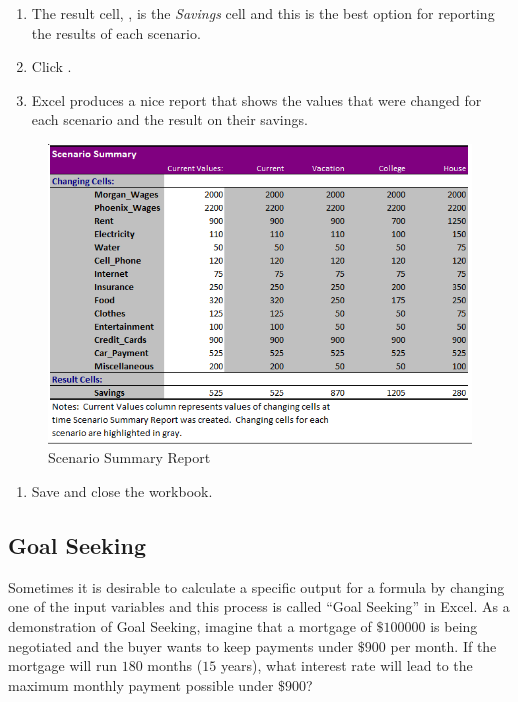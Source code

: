 \begin{enumerate}[resume]	
	
	\item The result cell, , is the \textit{Savings} cell and this is the best option for reporting the results of each scenario.
	\item Click .
	\item Excel produces a nice report that shows the values that were changed for each scenario and the result on their savings. 
\end{enumerate}

\begin{figure}[H]
	\centering
	\includegraphics[width=\maxwidth{.95\linewidth}]{gfx/ch08_fig59}
	\caption{Scenario Summary Report}
	\label{08:fig59}
\end{figure}

\begin{enumerate}[resume]
	\item Save and close the  workbook.
\end{enumerate}

\subsection{Goal Seeking}

Sometimes it is desirable to calculate a specific output for a formula by changing one of the input variables and this process is called ``Goal Seeking'' in Excel. As a demonstration of Goal Seeking, imagine that a mortgage of $ \$100000 $ is being negotiated and the buyer wants to keep payments under $ \$900 $ per month. If the mortgage will run $ 180 $ months ($ 15 $ years), what interest rate will lead to the maximum monthly payment possible under $ \$900 $?

